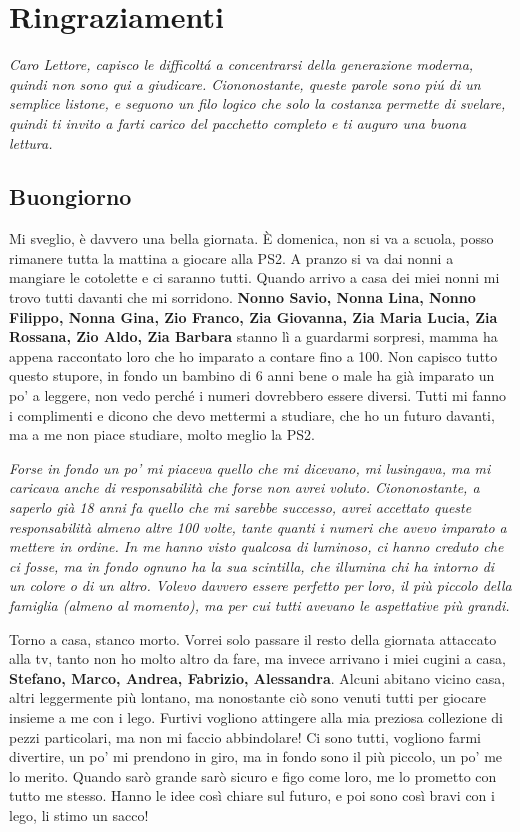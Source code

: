 \chapter{Ringraziamenti}
\textit{Caro Lettore, capisco le difficoltá a concentrarsi della generazione moderna, quindi non sono qui a giudicare. Ciononostante, queste parole sono piú di un semplice listone, e seguono un filo logico che solo la costanza permette di svelare, quindi ti invito a farti carico del pacchetto completo e ti auguro una buona lettura.}

\section{Buongiorno}
Mi sveglio, è davvero una bella giornata. È domenica, non si va a scuola, posso rimanere tutta la mattina a giocare alla PS2. A pranzo si va dai nonni a mangiare le cotolette e ci saranno tutti. Quando arrivo a casa dei miei nonni mi trovo tutti davanti che mi sorridono. \textbf{Nonno Savio, Nonna Lina, Nonno Filippo, Nonna Gina, Zio Franco, Zia Giovanna, Zia Maria Lucia, Zia Rossana, Zio Aldo, Zia Barbara} stanno lì a guardarmi sorpresi, mamma ha appena raccontato loro che ho imparato a contare fino a 100. Non capisco tutto questo stupore, in fondo un bambino di 6 anni bene o male ha già imparato un po' a leggere, non vedo perché i numeri dovrebbero essere diversi. Tutti mi fanno i complimenti e dicono che devo mettermi a studiare, che ho un futuro davanti, ma a me non piace studiare, molto meglio la PS2.
\vspace{5mm}

\textit{Forse in fondo un po' mi piaceva quello che mi dicevano, mi lusingava, ma mi caricava anche di responsabilità che forse non avrei voluto. Ciononostante, a saperlo già 18 anni fa quello che mi sarebbe successo, avrei accettato queste responsabilità almeno altre 100 volte, tante quanti i numeri che avevo imparato a mettere in ordine. In me hanno visto qualcosa di luminoso, ci hanno creduto che ci fosse, ma in fondo ognuno ha la sua scintilla, che illumina chi ha intorno di un colore o di un altro. Volevo davvero essere perfetto per loro, il più piccolo della famiglia (almeno al momento), ma per cui tutti avevano le aspettative più grandi.}
\vspace{5mm}

Torno a casa, stanco morto. Vorrei solo passare il resto della giornata attaccato alla tv, tanto non ho molto altro da fare, ma invece arrivano i miei cugini a casa, \textbf{Stefano, Marco, Andrea, Fabrizio, Alessandra}. Alcuni abitano vicino casa, altri leggermente più lontano, ma nonostante ciò sono venuti tutti per giocare insieme a me con i lego. Furtivi vogliono attingere alla mia preziosa collezione di pezzi particolari, ma non mi faccio abbindolare! Ci sono tutti, vogliono farmi divertire, un po' mi prendono in giro, ma in fondo sono il più piccolo, un po' me lo merito. Quando sarò grande sarò sicuro e figo come loro, me lo prometto con tutto me stesso. Hanno le idee così chiare sul futuro, e poi sono così bravi con i lego, li stimo un sacco!
\vspace{5mm}

